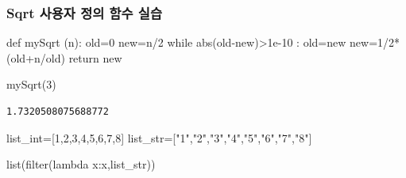 \documentclass[
  a4paper,
  DIV=11,
  numbers=noendperiod]{scrreprt}
\newenvironment{Shaded}{\begin{snugshade}}{\end{snugshade}}
\newcommand{\BuiltInTok}[1]{\textcolor[rgb]{0.00,0.23,0.31}{#1}}
\newcommand{\ControlFlowTok}[1]{\textcolor[rgb]{0.00,0.23,0.31}{#1}}
\newcommand{\DecValTok}[1]{\textcolor[rgb]{0.68,0.00,0.00}{#1}}
\newcommand{\FloatTok}[1]{\textcolor[rgb]{0.68,0.00,0.00}{#1}}
\newcommand{\KeywordTok}[1]{\textcolor[rgb]{0.00,0.23,0.31}{#1}}
\newcommand{\NormalTok}[1]{\textcolor[rgb]{0.00,0.23,0.31}{#1}}
\newcommand{\OperatorTok}[1]{\textcolor[rgb]{0.37,0.37,0.37}{#1}}
\newcommand{\StringTok}[1]{\textcolor[rgb]{0.13,0.47,0.30}{#1}}
\begin{document}
\subsubsection{Sqrt 사용자 정의 함수
실습}\label{sqrt-uxc0acuxc6a9uxc790-uxc815uxc758-uxd568uxc218-uxc2e4uxc2b5}

\begin{Shaded}
\begin{Highlighting}[]
\KeywordTok{def}\NormalTok{ mySqrt (n):}
\NormalTok{    old}\OperatorTok{=}\DecValTok{0}
\NormalTok{    new}\OperatorTok{=}\NormalTok{n}\OperatorTok{/}\DecValTok{2}
    \ControlFlowTok{while} \BuiltInTok{abs}\NormalTok{(old}\OperatorTok{{-}}\NormalTok{new)}\OperatorTok{\textgreater{}}\FloatTok{1e{-}10}\NormalTok{ :}
\NormalTok{        old}\OperatorTok{=}\NormalTok{new}
\NormalTok{        new}\OperatorTok{=}\DecValTok{1}\OperatorTok{/}\DecValTok{2}\OperatorTok{*}\NormalTok{(old}\OperatorTok{+}\NormalTok{n}\OperatorTok{/}\NormalTok{old)}
    \ControlFlowTok{return}\NormalTok{ new}
\end{Highlighting}
\end{Shaded}

\begin{Shaded}
\begin{Highlighting}[]
\NormalTok{mySqrt(}\DecValTok{3}\NormalTok{)}
\end{Highlighting}
\end{Shaded}

\begin{verbatim}
1.7320508075688772
\end{verbatim}

\begin{Shaded}
\begin{Highlighting}[]
\NormalTok{list\_int}\OperatorTok{=}\NormalTok{[}\DecValTok{1}\NormalTok{,}\DecValTok{2}\NormalTok{,}\DecValTok{3}\NormalTok{,}\DecValTok{4}\NormalTok{,}\DecValTok{5}\NormalTok{,}\DecValTok{6}\NormalTok{,}\DecValTok{7}\NormalTok{,}\DecValTok{8}\NormalTok{]}
\NormalTok{list\_str}\OperatorTok{=}\NormalTok{[}\StringTok{"1"}\NormalTok{,}\StringTok{"2"}\NormalTok{,}\StringTok{"3"}\NormalTok{,}\StringTok{"4"}\NormalTok{,}\StringTok{"5"}\NormalTok{,}\StringTok{"6"}\NormalTok{,}\StringTok{"7"}\NormalTok{,}\StringTok{"8"}\NormalTok{]}
\end{Highlighting}
\end{Shaded}

\begin{Shaded}
\begin{Highlighting}[]
\BuiltInTok{list}\NormalTok{(}\BuiltInTok{filter}\NormalTok{(}\KeywordTok{lambda}\NormalTok{ x:x,list\_str))}
\end{Highlighting}
\end{Shaded}
\end{document}
